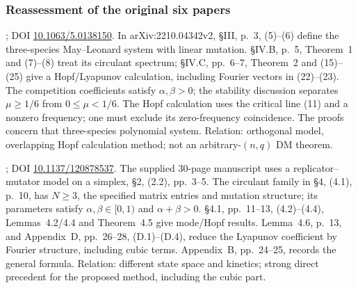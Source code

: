 \subsubsection{Reassessment of the original six papers}
\begin{description}[style=nextline,leftmargin=0pt,labelwidth=0pt,labelsep=0pt]
\item[S01: Jaramillo, Mrad and Stepien (2023).]
\cite{JaramilloMradStepien2023}; DOI \href{https://doi.org/10.1063/5.0138150}{10.1063/5.0138150}.
In arXiv:2210.04342v2, \S III, p.~3, (5)--(6) define the
three-species May--Leonard system with linear mutation. \S IV.B, p.~5,
Theorem~1 and (7)--(8) treat its circulant spectrum; \S IV.C, pp.~6--7,
Theorem~2 and (15)--(25) give a Hopf/Lyapunov calculation, including Fourier
vectors in (22)--(23). The competition coefficients satisfy $\alpha,\beta>0$;
the stability discussion separates $\mu\geq1/6$ from $0\leq\mu<1/6$.
The Hopf calculation uses the critical line (11) and a nonzero frequency;
one must exclude its zero-frequency coincidence. The proofs concern that
three-species polynomial system. Relation: orthogonal model, overlapping
Hopf calculation method; not an arbitrary-$(n,q)$ DM theorem.

\item[S02: Pais, Caicedo-N\'u\~nez and Leonard (2012).]
\cite{PaisCaicedoLeonard2012}; DOI \href{https://doi.org/10.1137/120878537}{10.1137/120878537}.
The supplied 30-page manuscript uses a replicator--mutator model on a simplex,
\S2, (2.2), pp.~3--5. The circulant family in \S4, (4.1), p.~10,
has $N\geq3$, the specified matrix entries and mutation structure; its
parameters satisfy $\alpha,\beta\in[0,1)$ and $\alpha+\beta>0$.
\S4.1, pp.~11--13, (4.2)--(4.4), Lemmas~4.2/4.4 and Theorem~4.5
give mode/Hopf results. Lemma~4.6, p.~13, and Appendix~D,
pp.~26--28, (D.1)--(D.4), reduce the Lyapunov coefficient by Fourier
structure, including cubic terms. Appendix~B, pp.~24--25, records
the general formula. Relation: different state space and kinetics;
strong direct precedent for the proposed method, including the cubic part.


\end{description}
